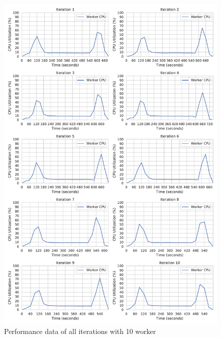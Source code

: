 \begin{figure}[h]
\centering
\includegraphics[scale=0.4]{images/07_evaluation/classification/10_worker_cpu_performance}
\caption{Performance data of all iterations with 10 worker}
\label{fig:appendix_eval_classification_static10}
\end{figure}


